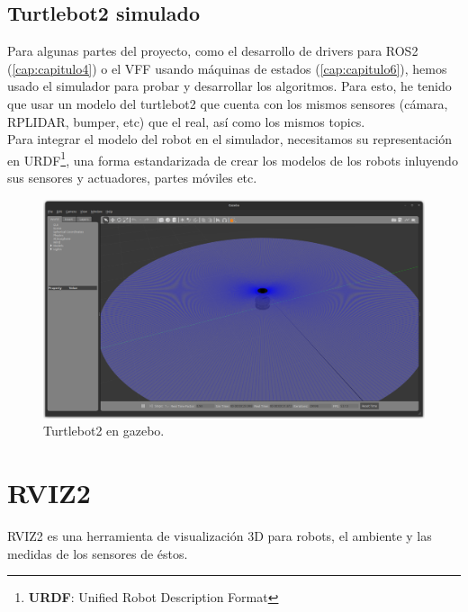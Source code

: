 \subsection{Turtlebot2 simulado}
\label{subsec:turtlebot2_sim}

Para algunas partes del proyecto, como el desarrollo de drivers para ROS2 (\ref{cap:capitulo4}) o el VFF usando máquinas de estados (\ref{cap:capitulo6}),
hemos usado el simulador para probar y desarrollar los algoritmos. Para esto, he tenido que usar un modelo del turtlebot2 que cuenta con los mismos
sensores (cámara, RPLIDAR, bumper, etc) que el real, así como los mismos topics.\\

Para integrar el modelo del robot en el simulador, necesitamos su representación en URDF\footnote{\textbf{URDF}: Unified Robot Description Format},
una forma estandarizada de crear los modelos de los robots inluyendo sus sensores y actuadores, partes móviles etc.

\begin{figure} [H]
    \begin{center}
        \includegraphics[width=14cm]{figs/c3/turtlebot2_sim.png}
    \end{center}
    \caption[Turtlebot2 simulado]{Turtlebot2 en gazebo.}
    \label{fig:turtlebot_2_sim}
\end{figure}


\newpage

\section{RVIZ2}
\label{sec:rviz2}

RVIZ2 es una herramienta de visualización 3D para robots, el ambiente y las medidas de los sensores de éstos.

